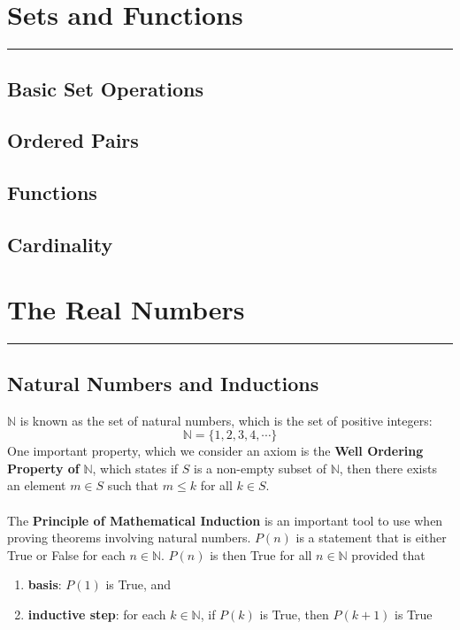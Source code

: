 \documentclass[11pt]{article}
\newcommand{\N}{\mathbb{N}}
\begin{document}
\section{Sets and Functions}
\hrule \vspace{15pt}

\subsection{Basic Set Operations}
\subsection{Ordered Pairs}
\subsection{Functions}
\subsection{Cardinality}
\pagebreak
\section{The Real Numbers}
\hrule \vspace{15pt}

\subsection{Natural Numbers and Inductions}
$\N$ is known as the set of natural numbers, which is the set of positive integers:
$$ \N = \{1,2,3,4, \cdots \}$$
One important property, which we consider an axiom is the \textbf{Well Ordering Property of} $\bm { \N }$, which states if $S$ is a non-empty subset of $\N$, then there exists an element $m \in S$ such that $ m \leq k$ for all $k \in S$.  \\ \\
The \textbf{Principle of Mathematical Induction} is an important tool to use when proving theorems involving natural numbers.  $P(n)$ is a statement that is either True or False for each $n \in \N$.  $P(n)$ is then True for all $n \in \N$ provided that 
\begin{enumerate}[label=(\alph*)]
\item \textbf{basis}: $P(1)$ is True, and
\item \textbf{inductive step}: for each $k \in \N$, if $P(k)$  is True, then $P(k+1)$ is True
\end{enumerate}
\end{document}
